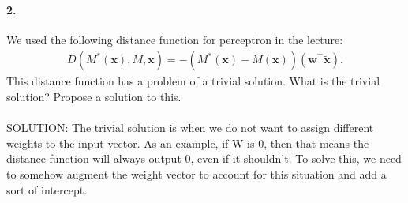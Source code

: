\documentclass{article}
\newcommand{\vect}[1]{\mathbf{#1}}
\newcommand{\vx}[0]{\vect{x}}
\newcommand{\vw}[0]{\vect{w}}
\begin{document}
\vspace{5mm}

\paragraph{2.} We used the following distance function for perceptron in the
lecture:
\begin{align*}
    D(M^*(\vx), M, \vx) = -\left( M^*(\vx) - M(\vx)
    \right) \left(\vw^\top
    \tilde{\vx}\right).
\end{align*}
This distance function has a problem of a trivial solution. What is the trivial
solution? Propose a solution to this.
\\
\\
SOLUTION: The trivial solution is when we do not want to assign different weights to the input vector. As an example, if W is 0, then that means the distance function will always output 0, even if it shouldn't. To solve this, we need to somehow augment the weight vector to account for this situation and add a sort of intercept.

\vspace{5mm}
\end{document}
